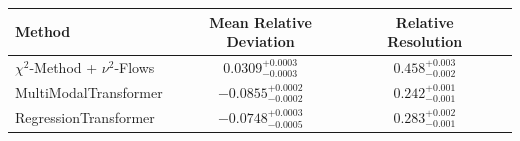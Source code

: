     \begin{tabular}{lccc}
        \toprule
        Method & Mean Relative Deviation & Relative Resolution \\
        \midrule
        $\chi^2$-Method + $\nu^2$-Flows & $0.0309_{-0.0003}^{+0.0003}$ & $0.458_{-0.002}^{+0.003}$ \\
        MultiModalTransformer & $-0.0855_{-0.0002}^{+0.0002}$ & $0.242_{-0.001}^{+0.001}$ \\
        RegressionTransformer & $-0.0748_{-0.0005}^{+0.0003}$ & $0.283_{-0.001}^{+0.002}$ \\
        \bottomrule
    \end{tabular}